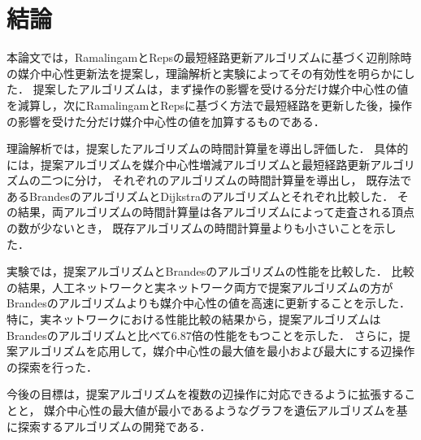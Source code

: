 \chapter{結論}
\label{chap:conclusion}
本論文では，RamalingamとRepsの最短経路更新アルゴリズムに基づく辺削除時の媒介中心性更新法を提案し，理論解析と実験によってその有効性を明らかにした．
提案したアルゴリズムは，まず操作の影響を受ける分だけ媒介中心性の値を減算し，次にRamalingamとRepsに基づく方法で最短経路を更新した後，操作の影響を受けた分だけ媒介中心性の値を加算するものである．

理論解析では，提案したアルゴリズムの時間計算量を導出し評価した．
具体的には，提案アルゴリズムを媒介中心性増減アルゴリズムと最短経路更新アルゴリズムの二つに分け，
それぞれのアルゴリズムの時間計算量を導出し，
既存法であるBrandesのアルゴリズムとDijkstraのアルゴリズムとそれぞれ比較した．
その結果，両アルゴリズムの時間計算量は各アルゴリズムによって走査される頂点の数が少ないとき，
既存アルゴリズムの時間計算量よりも小さいことを示した．

実験では，提案アルゴリズムとBrandesのアルゴリズムの性能を比較した．
比較の結果，人工ネットワークと実ネットワーク両方で提案アルゴリズムの方がBrandesのアルゴリズムよりも媒介中心性の値を高速に更新することを示した．
特に，実ネットワークにおける性能比較の結果から，提案アルゴリズムはBrandesのアルゴリズムと比べて$6.87$倍の性能をもつことを示した．
さらに，提案アルゴリズムを応用して，媒介中心性の最大値を最小および最大にする辺操作の探索を行った．

今後の目標は，提案アルゴリズムを複数の辺操作に対応できるように拡張することと，
媒介中心性の最大値が最小であるようなグラフを遺伝アルゴリズムを基に探索するアルゴリズムの開発である．
